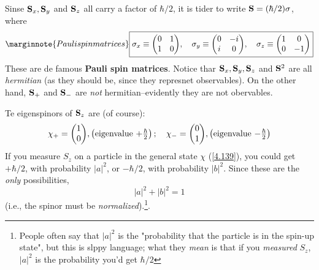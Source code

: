 Sinse $\vb{S}_x, \vb{S}_y$ and $\vb{S}_z$ all carry a factor of $\hbar/2$, it is tider to write $\vb{S}=(\hbar/2)\sigma$, where
\begin{equation}\label{4.148}\marginnote{Pauli spin matrices}
	\boxed{\sigma_x\equiv\mqty(0&1\\1&0),\quad \sigma_y\equiv\mqty(0&-i\\i&0),\quad \sigma_z\equiv\mqty(1&0\\0&-1)}
\end{equation}
These are de famous \textbf{Pauli spin matrices}. Notice thar $\vb{S}_x, \vb{S}_y, \vb{S}_z$ and $\vb{S}^2$ are all \textit{hermitian} (as they should be, since they represnet observables). On the other hand, $\vb{S}_+$ and $\vb{S}_-$ are \textit{not} hermitian--evidently they are not obervables.

Te eigenspinors of $\vb{S}_z$ are (of course):
\begin{equation}\label{4.149}
	\chi_+=\mqty(1\\0), \left(\mbox{eigenvalue $+\frac{\hbar}{2}$}\right);\quad \chi_-=\mqty(0\\1), \left(\mbox{eigenvalue $-\frac{\hbar}{2}$}\right)
\end{equation}
If you measure $S_z$ on a particle in the general state $\chi$ (\ref{4.139}), you could get $+\hbar/2$, with probability $|a|^2$, or $-\hbar/2$, with probability $|b|^2$. Since these are the \textit{only} possibilities,
\begin{equation}\label{4.150}
	|a|^2+|b|^2=1
\end{equation}
(i.e., the spinor must be \textit{normalized}).\footnote{People often say that $|a|^2$ is the "probability that the particle is in the spin-up state", but this is slppy language; what they \textit{mean} is that if you \textit{measured} $S_z$, $|a|^2$ is the probability you'd get $\hbar/2$}.

